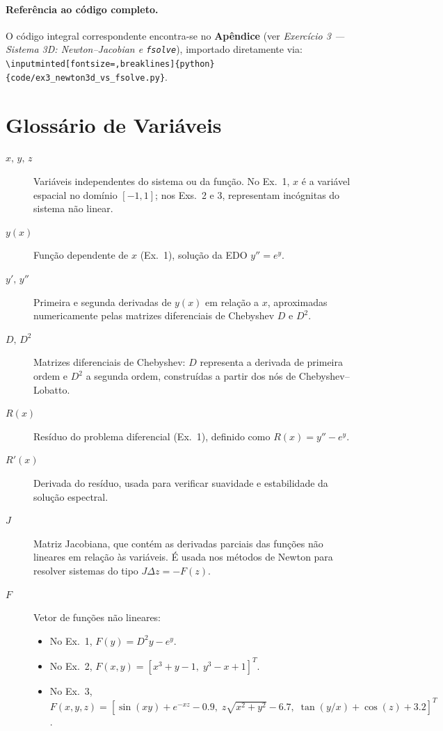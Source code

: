 \documentclass[12pt,a4paper]{article}
\begin{document}
\paragraph{Referência ao código completo.}
O código integral correspondente encontra-se no \textbf{Apêndice} (ver \emph{Exercício 3 — Sistema 3D: Newton--Jacobian e \texttt{fsolve}}),
importado diretamente via:
\texttt{\textbackslash inputminted[fontsize=\footnotesize,breaklines]\{python\}\{code/ex3\_newton3d\_vs\_fsolve.py\}}.


\section{Glossário de Variáveis}

\begin{description}
    \item[$x,\,y,\,z$] Variáveis independentes do sistema ou da função. 
    No Ex.~1, $x$ é a variável espacial no domínio $[-1,1]$; 
    nos Exs.~2 e 3, representam incógnitas do sistema não linear.

    \item[$y(x)$] Função dependente de $x$ (Ex.~1), solução da EDO $y'' = e^{y}$.

    \item[$y',\,y''$] Primeira e segunda derivadas de $y(x)$ em relação a $x$,
    aproximadas numericamente pelas matrizes diferenciais de Chebyshev $D$ e $D^2$.

    \item[$D,\,D^2$] Matrizes diferenciais de Chebyshev: $D$ representa a derivada de primeira ordem e $D^2$ a segunda ordem, 
    construídas a partir dos nós de Chebyshev–Lobatto.

    \item[$R(x)$] Resíduo do problema diferencial (Ex.~1), definido como $R(x) = y'' - e^{y}$.

    \item[$R'(x)$] Derivada do resíduo, usada para verificar suavidade e estabilidade da solução espectral.

    \item[$J$] Matriz Jacobiana, que contém as derivadas parciais das funções não lineares em relação às variáveis.
    É usada nos métodos de Newton para resolver sistemas do tipo $J \Delta z = -F(z)$.

    \item[$F$] Vetor de funções não lineares:
    \begin{itemize}
        \item No Ex.~1, $F(y) = D^2 y - e^{y}$.
        \item No Ex.~2, $F(x,y) = [x^3 + y - 1,\; y^3 - x + 1]^T$.
        \item No Ex.~3, $F(x,y,z) = [\sin(xy) + e^{-xz} - 0.9,\; z\sqrt{x^2 + y^2} - 6.7,\; \tan(y/x) + \cos(z) + 3.2]^T$.
    \end{itemize}


\end{description}
\end{document}
